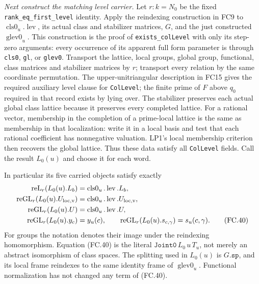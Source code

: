 \emph{Next construct the matching level carrier.}
Let $r:k=N_0$ be the fixed \texttt{rank\_eq\_first\_level}
identity. Apply the reindexing construction in FC9 to
$\operatorname{cls0}_u.\operatorname{lev}$, its actual class and
stabilizer matrices, $G$, and the just constructed
$\operatorname{glev0}_u$. This construction is the proof of
\texttt{exists\_colLevel} with only its step-zero arguments:
every occurrence of its apparent full form parameter is through
\texttt{cls0}, \texttt{gl}, or \texttt{glev0}.
Transport the lattice, local groups, global group, functional,
class matrices and stabilizer matrices by $r$; transport every
relation by the same coordinate permutation. The upper-unitriangular
description in FC15 gives the required auxiliary level clause for
\texttt{ColLevel}; the finite prime of $F$ above $q_0$ required in
that record exists by lying over. The stabilizer preserves each actual global
class lattice because it preserves every completed lattice. For a rational
vector, membership in the completion of a prime-local lattice is the same
as membership in that localization: write it in a local basis and test
that each rational coefficient has nonnegative valuation. LP1's local
membership criterion then recovers the global lattice.
Thus these data satisfy all \texttt{ColLevel} fields. Call the result
$L_0(u)$ and choose it for each word.

In particular its five carried objects satisfy exactly
\[
\begin{split}
 \operatorname{reL}_{r}(L_0(u).L_b)&=
                         \operatorname{cls0}_u.\operatorname{lev}.L_b,\\
 \operatorname{reGL}_{r}(L_0(u).U_{\rm loc,v})&=
                         \operatorname{cls0}_u.\operatorname{lev}.U_{\rm loc,v},\\
 \operatorname{reGL}_{r}(L_0(u).U)&=
                         \operatorname{cls0}_u.\operatorname{lev}.U,\\
 \operatorname{reGL}_{r}(L_0(u).y_c)&=y_u(c),\qquad
 \operatorname{reGL}_{r}(L_0(u).s_{c,\gamma})=s_u(c,\gamma).
 \tag{FC.40}
\end{split}
\]
For groups the notation denotes their image under the reindexing
homomorphism. Equation (FC.40) is the literal
$\texttt{Joint0}\,L_0\,u\,T_u$, not merely an abstract isomorphism
of class spaces. The splitting used in $L_0(u)$ is $G.\texttt{sp}$,
and its local frame reindexes to the same identity frame of
$\operatorname{glev0}_u$. Functional normalization has not changed
any term of (FC.40).

